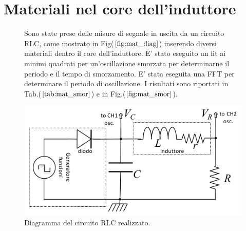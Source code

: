 \documentclass{article}
\begin{document}
\section{Materiali nel core dell'induttore}
\begin{figure}[H]
    \begin{minipage}{0.45\textwidth}
        Sono state prese delle misure di segnale in uscita da un circuito RLC,
        come mostrato in Fig($\ref{fig:mat_diag}$) inserendo diversi materiali dentro 
        il core dell'induttore.
        E' stato eseguito un fit ai minimi quadrati per un'oscillazione 
        smorzata per determinarne il periodo e il tempo di smorzamento.
        E' stata eseguita una FFT per determinare il periodo di oscillazione.
        I risultati sono riportati in Tab.($\ref{tab:mat_smor}$) e 
        in Fig.($\ref{fig:mat_smor}$).
    \end{minipage}
    \hfill
    \begin{minipage}{0.45\textwidth}
        \includegraphics[width=\textwidth]{FFT13/RLCmaterialsdiagram.png}
        \caption{Diagramma del circuito RLC realizzato.}
        \label{fig:mat_diag}
    \end{minipage}
\end{figure}
\end{document}
